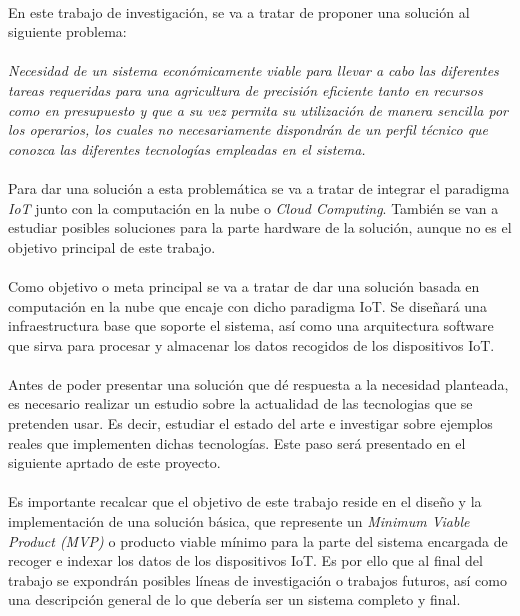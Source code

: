 \documentclass[../../memoria.tex]{subfiles}
\begin{document}
\paragraph{}
En este trabajo de investigación, se va a tratar de proponer una solución al siguiente problema:

\paragraph{}
\textit{
    Necesidad de un sistema económicamente viable para llevar a cabo las diferentes tareas requeridas para una agricultura de precisión eficiente tanto en recursos como en presupuesto y que a su vez permita su utilización de manera sencilla por los operarios, los cuales no necesariamente dispondrán de un perfil técnico que conozca las diferentes tecnologías empleadas en el sistema.
}

\paragraph{}
Para dar una solución a esta problemática se va a tratar de integrar el paradigma \textit{IoT} junto con la computación en la nube o \textit{Cloud Computing}. También se van a estudiar posibles soluciones para la parte hardware de la solución, aunque no es el objetivo principal de este trabajo.

\paragraph{}
Como objetivo o meta principal se va a tratar de dar una solución basada en computación en la nube que encaje con dicho paradigma IoT. Se diseñará una infraestructura base que soporte el sistema, así como una arquitectura software que sirva para procesar y almacenar los datos recogidos de los dispositivos IoT.

\paragraph{}
Antes de poder presentar una solución que dé respuesta a la necesidad planteada, es necesario realizar un estudio sobre la actualidad de las tecnologias que se pretenden usar. Es decir, estudiar el estado del arte e investigar sobre ejemplos reales que implementen dichas tecnologías. Este paso será presentado en el siguiente aprtado de este proyecto.

\paragraph{}
Es importante recalcar que el objetivo de este trabajo reside en el diseño y la implementación de una solución básica, que represente un \textit{Minimum Viable Product (MVP)} o producto viable mínimo para la parte del sistema encargada de recoger e indexar los datos de los dispositivos IoT. Es por ello que al final del trabajo se expondrán posibles líneas de investigación o trabajos futuros, así como una descripción general de lo que debería ser un sistema completo y final.
\end{document}
